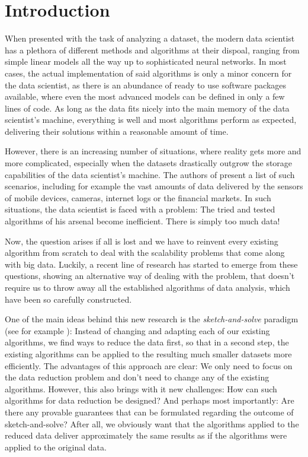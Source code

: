 \section{Introduction}

When presented with the task of analyzing a dataset, the modern
data scientist has a plethora of different methods and algorithms
at their dispoal, ranging from simple linear models all the way up to
sophisticated neural networks.
In most cases, the actual implementation of said algorithms is only
a minor concern for the data scientist, as there is an abundance of
ready to use software packages available, where even the most
advanced models can be defined in only a few lines of code.
As long as the data fits nicely into the main memory of the
data scientist's machine, everything is well and most algorithms
perform as expected, delivering their solutions within a reasonable
amount of time.

However, there is an increasing number of situations, where
reality gets more and more complicated, especially when the
datasets drastically outgrow the storage capabilities
of the data scientist's machine.
The authors of \cite{big-data-tiny-data} present a list of such
scenarios, including for example the vast amounts of data
delivered by the sensors of mobile devices, cameras,
internet logs or the financial markets.
In such situations, the data scientist is faced with a problem:
The tried and tested algorithms of his arsenal become inefficient.
There is simply too much data!

Now, the question arises if all is lost and we have to reinvent
every existing algorithm from scratch to deal with the scalability
problems that come along with big data.
Luckily, a recent line of research has started to emerge from
these questions, showing an alternative way of dealing with
the problem, that doesn't require us to throw away all the established
algorithms of data analysis, which have been so carefully constructed.

One of the main ideas behind this new research is the
\textit{sketch-and-solve} paradigm
(see for example \cite{woodruff-2014}):
Instead of changing and adapting each of our existing algorithms,
we find ways to reduce the data first,
so that in a second step, the existing algorithms can be
applied to the resulting much smaller datasets more efficiently.
The advantages of this approach are clear: We only need to
focus on the data reduction problem and don't need to change
any of the existing algorithms. However, this also brings
with it new challenges: How can such algorithms for data
reduction be designed? And perhaps most importantly:
Are there any provable guarantees that can be formulated
regarding the outcome of sketch-and-solve?
After all, we obviously want that the algorithms applied to
the reduced data deliver approximately the same results as
if the algorithms were applied to the original data.

